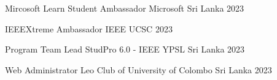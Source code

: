 

\begin{cvhonors}

  \cvhonor
    {Mircosoft Learn Student Ambassador} %
    {Microsoft} %
    {Sri Lanka} %
    {2023} %

  \cvhonor
    {IEEEXtreme Ambassador} %
    {IEEE} %
    {UCSC}
    {2023} %

\cvhonor
    {Program Team Lead} %
    {StudPro 6.0 - IEEE YPSL} %
    {Sri Lanka}
    {2023} %

\cvhonor
{Web Administrator} %
{Leo Club of University of Colombo} %
{Sri Lanka}
{2023} %


\end{cvhonors}

